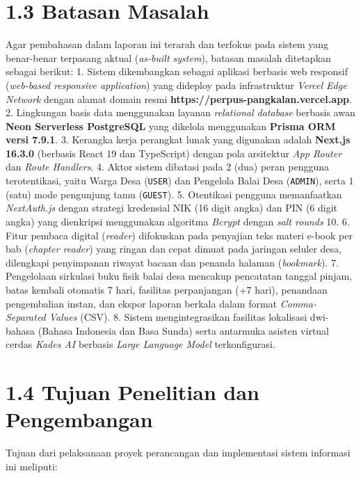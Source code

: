\documentclass[
  indonesian,
  12pt,
]{report}
\begin{document}
\section{1.3 Batasan Masalah}\label{batasan-masalah}

Agar pembahasan dalam laporan ini terarah dan terfokus pada sistem yang
benar-benar terpasang aktual (\emph{as-built system}), batasan masalah
ditetapkan sebagai berikut: 1. Sistem dikembangkan sebagai aplikasi
berbasis web responsif (\emph{web-based responsive application}) yang
dideploy pada infrastruktur \emph{Vercel Edge Network} dengan alamat
domain resmi \textbf{https://perpus-pangkalan.vercel.app}. 2. Lingkungan
basis data menggunakan layanan \emph{relational database} berbasis awan
\textbf{Neon Serverless PostgreSQL} yang dikelola menggunakan
\textbf{Prisma ORM versi 7.9.1}. 3. Kerangka kerja perangkat lunak yang
digunakan adalah \textbf{Next.js 16.3.0} (berbasis React 19 dan
TypeScript) dengan pola arsitektur \emph{App Router} dan \emph{Route
Handlers}. 4. Aktor sistem dibatasi pada 2 (dua) peran pengguna
terotentikasi, yaitu Warga Desa (\texttt{USER}) dan Pengelola Balai Desa
(\texttt{ADMIN}), serta 1 (satu) mode pengunjung tamu (\texttt{GUEST}).
5. Otentikasi pengguna memanfaatkan \emph{NextAuth.js} dengan strategi
kredensial NIK (16 digit angka) dan PIN (6 digit angka) yang dienkripsi
menggunakan algoritma \emph{Bcrypt} dengan \emph{salt rounds} 10. 6.
Fitur pembaca digital (\emph{reader}) difokuskan pada penyajian teks
materi e-book per bab (\emph{chapter reader}) yang ringan dan cepat
dimuat pada jaringan seluler desa, dilengkapi penyimpanan riwayat bacaan
dan penanda halaman (\emph{bookmark}). 7. Pengelolaan sirkulasi buku
fisik balai desa mencakup pencatatan tanggal pinjam, batas kembali
otomatis 7 hari, fasilitas perpanjangan (+7 hari), penandaan
pengembalian instan, dan ekspor laporan berkala dalam format
\emph{Comma-Separated Values} (CSV). 8. Sistem mengintegrasikan
fasilitas lokalisasi dwi-bahasa (Bahasa Indonesia dan Basa Sunda) serta
antarmuka asisten virtual cerdas \emph{Kades AI} berbasis \emph{Large
Language Model} terkonfigurasi.

\section{1.4 Tujuan Penelitian dan
Pengembangan}\label{tujuan-penelitian-dan-pengembangan}

Tujuan dari pelaksanaan proyek perancangan dan implementasi sistem
informasi ini meliputi:
\end{document}

